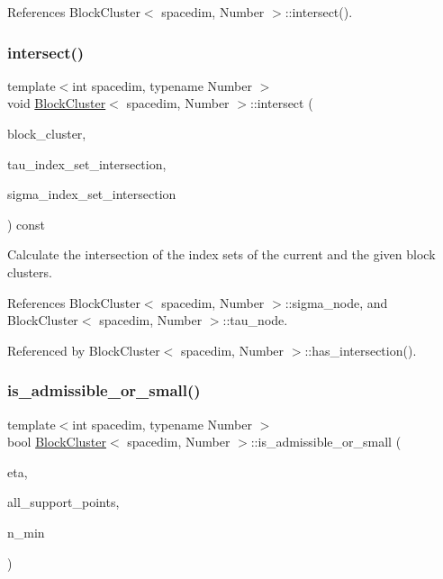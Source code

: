 References Block\+Cluster$<$ spacedim, Number $>$\+::intersect().

\mbox{\label{classBlockCluster_a361efceed1f584db66a518007b5af633}} 
\subsubsection{\texorpdfstring{intersect()}{intersect()}}
{\footnotesize\ttfamily template$<$int spacedim, typename Number $>$ \\
void \hyperlink{classBlockCluster}{Block\+Cluster}$<$ spacedim, Number $>$\+::intersect (\begin{DoxyParamCaption}\item[{const \hyperlink{classBlockCluster}{Block\+Cluster}$<$ spacedim, Number $>$ \&}]{block\+\_\+cluster,  }\item[{std\+::vector$<$ types\+::global\+\_\+dof\+\_\+index $>$ \&}]{tau\+\_\+index\+\_\+set\+\_\+intersection,  }\item[{std\+::vector$<$ types\+::global\+\_\+dof\+\_\+index $>$ \&}]{sigma\+\_\+index\+\_\+set\+\_\+intersection }\end{DoxyParamCaption}) const}

Calculate the intersection of the index sets of the current and the given block clusters. 

References Block\+Cluster$<$ spacedim, Number $>$\+::sigma\+\_\+node, and Block\+Cluster$<$ spacedim, Number $>$\+::tau\+\_\+node.



Referenced by Block\+Cluster$<$ spacedim, Number $>$\+::has\+\_\+intersection().

\mbox{\label{classBlockCluster_a3d1d12357cac0ff4df90fd576c5f2aa0}} 
\subsubsection{\texorpdfstring{is\+\_\+admissible\+\_\+or\+\_\+small()}{is\_admissible\_or\_small()}\hspace{0.1cm}{\footnotesize\ttfamily [1/2]}}
{\footnotesize\ttfamily template$<$int spacedim, typename Number $>$ \\
bool \hyperlink{classBlockCluster}{Block\+Cluster}$<$ spacedim, Number $>$\+::is\+\_\+admissible\+\_\+or\+\_\+small (\begin{DoxyParamCaption}\item[{Number}]{eta,  }\item[{const std\+::vector$<$ Point$<$ spacedim, Number $>$$>$ \&}]{all\+\_\+support\+\_\+points,  }\item[{unsigned int}]{n\+\_\+min }\end{DoxyParamCaption})}

